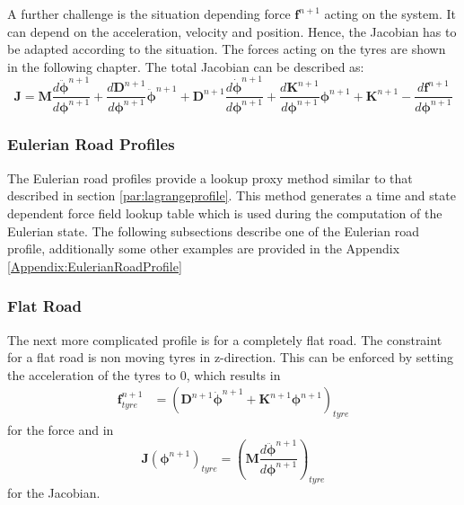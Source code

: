 \noindent A further challenge is the situation depending force $\boldsymbol{f}^{n+1}$ acting on the system. It can depend on the acceleration, velocity and position. Hence, the Jacobian has to be adapted according to the situation. The forces acting on the tyres are shown in the following chapter. The total Jacobian can be described as:
\begin{equation}
    \boldsymbol{J} = \boldsymbol{M} \frac{d \ddot{\boldsymbol{\phi}}^{n+1}}{d \boldsymbol{\phi}^{n+1}} + \frac{d \boldsymbol{D}^{n+1}}{d \boldsymbol{\phi}^{n+1}} \ddot{\boldsymbol{\phi}}^{n+1} + \boldsymbol{D}^{n+1} \frac{d \dot{\boldsymbol{\phi}}^{n+1}}{d \boldsymbol{\phi}^{n+1}} + \frac{d \boldsymbol{K}^{n+1}}{d \boldsymbol{\phi}^{n+1}} \boldsymbol{\phi}^{n+1} + \boldsymbol{K}^{n+1}  - \frac{d \boldsymbol{f}^{n+1}}{d \boldsymbol{\phi}^{n+1}}
\end{equation}

\subsubsection{Eulerian Road Profiles} \label{subsection:eulerprofile}

\noindent The Eulerian road profiles provide a lookup proxy method similar to that described in section \ref{par:lagrangeprofile}. This method generates a time and state dependent force field lookup table which is used during the computation of the Eulerian state. The following subsections describe one of the Eulerian road profile, additionally some other examples are provided in the Appendix \ref{Appendix:EulerianRoadProfile}

\subsubsection*{Flat Road} \label{par:FlatRoad}
The next more complicated profile is for a completely flat road. The constraint for a flat road is non moving tyres in z-direction. This can be enforced by setting the acceleration of the tyres to 0, which results in
\begin{align}
    \boldsymbol{f}^{n+1}_{tyre} &=  \left(\boldsymbol{D}^{n+1} \dot{\boldsymbol{\phi}}^{n+1} + \boldsymbol{K}^{n+1}\boldsymbol{\phi}^{n+1}\right)_{tyre}
\end{align}
for the force and in
\begin{equation}
     \boldsymbol{J}(\boldsymbol{\phi}^{n+1})_{tyre} = \left(\boldsymbol{M} \frac{d \ddot{\boldsymbol{\phi}}^{n+1}}{d \boldsymbol{\phi}^{n+1}}\right)_{tyre}
\end{equation}
for the Jacobian.

